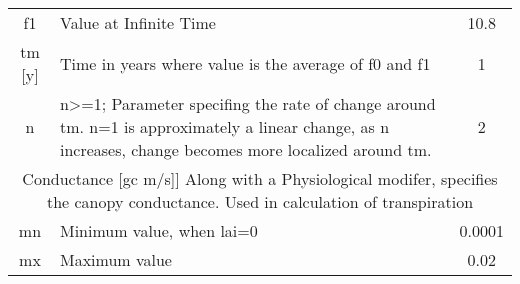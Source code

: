 \begin{tabularx}{\linewidth}{|c|X|c|}
f1 & Value at Infinite Time & 10.8\\
tm [y] & Time in years where value is the average of f0 and f1 & 1\\
n  & n>=1; Parameter specifing the rate of change around tm.  n=1 is approximately a linear change, as n increases, change becomes more localized around tm. & 2\\
\hline
\multicolumn{3}{|X|}{Conductance [gc m/s]]  Along with a Physiological modifer, specifies the canopy conductance.  Used in calculation of transpiration}\\
mn & Minimum value, when lai=0 & 0.0001\\
mx & Maximum value & 0.02\\
\hline

\end{tabularx}
